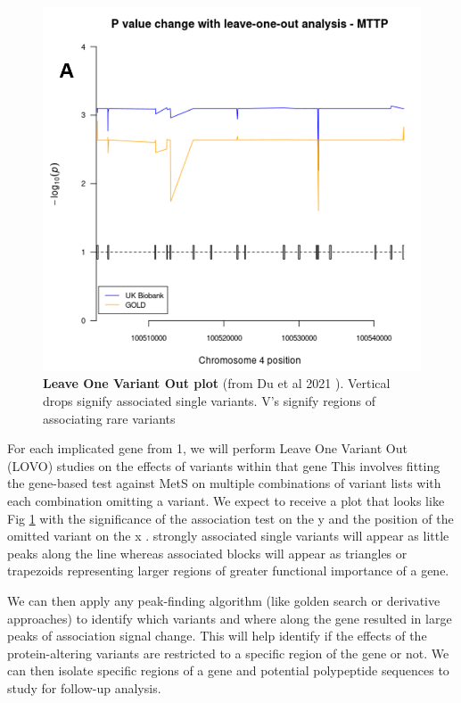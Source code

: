 \documentclass[11pt]{article}
\begin{document}
\noindent {}

\begin{figure}
  \includegraphics[width=1.0\linewidth]{"images/fig2.png"} 
  \caption{\textbf{Leave One Variant Out plot} (from Du et al 2021 \cite{du_stetson_2021}). Vertical drops signify associated single variants. V's signify regions of associating rare variants}
  \label{fig:f2}
\end{figure}

For each implicated gene from 1, we will perform Leave One Variant Out (LOVO) studies on the effects of variants within that gene This involves fitting the gene-based test against MetS on multiple combinations of variant lists with each combination omitting a variant. We expect to receive a plot that looks like Fig \ref{fig:f2} with the significance of the association test on the y and the position of the omitted variant on the x \cite{du_stetson_2021}. strongly associated single variants will appear as little peaks along the line whereas associated blocks will appear as triangles or trapezoids representing larger regions of greater functional importance of a gene.
  
We can then apply any peak-finding algorithm (like golden search or derivative approaches) to identify which variants and where along the gene resulted in large peaks of association signal change. This will help identify if the effects of the protein-altering variants are restricted to a specific region of the gene or not. We can then isolate specific regions of a gene and potential polypeptide sequences to study for follow-up analysis.
\end{document}
